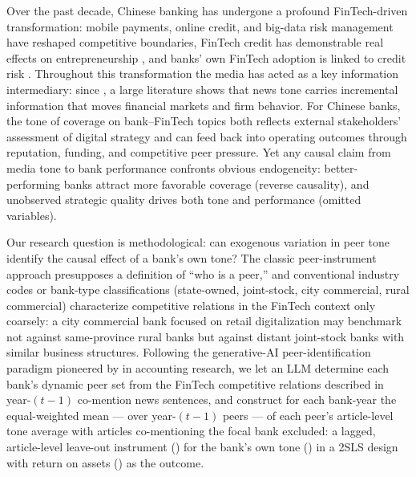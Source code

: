 Over the past decade, Chinese banking has undergone a profound FinTech-driven transformation:
mobile payments, online credit, and big-data risk management have reshaped competitive
boundaries, FinTech credit has demonstrable real effects on entrepreneurship
\parencite{hau2024fintechcredit}, and banks' own FinTech adoption is linked to credit risk
\parencite{cheng2020bankfintech}. Throughout this transformation the media has acted as a key
information intermediary: since \textcite{tetlock2007media}, a large literature shows that
news tone carries incremental information that moves financial markets and firm behavior. For
Chinese banks, the tone of coverage on bank--FinTech topics both reflects external
stakeholders' assessment of digital strategy and can feed back into operating outcomes through
reputation, funding, and competitive peer pressure. Yet any causal claim from media tone to
bank performance confronts obvious endogeneity: better-performing banks attract more favorable
coverage (reverse causality), and unobserved strategic quality drives both tone and
performance (omitted variables).

Our research question is methodological: can exogenous variation in peer tone identify the
causal effect of a bank's own tone? The classic peer-instrument approach
\parencite{leary2014peerfirms} presupposes a definition of ``who is a peer,'' and conventional
industry codes or bank-type classifications (state-owned, joint-stock, city commercial, rural
commercial) characterize competitive relations in the FinTech context only coarsely: a city
commercial bank focused on retail digitalization may benchmark not against same-province rural
banks but against distant joint-stock banks with similar business structures. Following the
generative-AI peer-identification paradigm pioneered by \textcite{cao2025genai} in accounting
research, we let an LLM determine each bank's dynamic peer set from the FinTech competitive
relations described in year-$(t-1)$ co-mention news sentences, and construct for each
bank-year the equal-weighted mean --- over year-$(t-1)$ peers --- of each peer's
article-level tone average with articles co-mentioning the focal bank excluded: a
lagged, article-level leave-out instrument () for the bank's
own tone () in a 2SLS design with return on assets ()
as the outcome.

